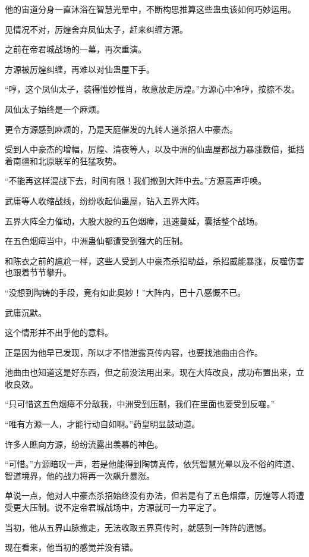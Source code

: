 \begin{this_body}
他的宙道分身一直沐浴在智慧光晕中，不断构思推算这些蛊虫该如何巧妙运用。

见情况不对，厉煌舍弃凤仙太子，赶来纠缠方源。

之前在帝君城战场的一幕，再次重演。

方源被厉煌纠缠，再难以对仙蛊屋下手。

“哼，这个凤仙太子，装得惟妙惟肖，故意放走厉煌。”方源心中冷哼，按捺不发。

凤仙太子始终是一个麻烦。

更令方源感到麻烦的，乃是天庭催发的九转人道杀招人中豪杰。

受到人中豪杰的增幅，厉煌、清夜等人，以及中洲的仙蛊屋都战力暴涨数倍，抵挡着南疆和北原联军的狂猛攻势。

“不能再这样混战下去，时间有限！我们撤到大阵中去。”方源高声呼唤。

武庸等人收缩战线，纷纷收起仙蛊屋，钻入五界大阵。

五界大阵全力催动，大股大股的五色烟瘴，迅速蔓延，囊括整个战场。

在五色烟瘴当中，中洲蛊仙都遭受到强大的压制。

和陈衣之前的尴尬一样，这些人受到人中豪杰杀招助益，杀招威能暴涨，反噬伤害也跟着节节攀升。

“没想到陶铸的手段，竟有如此奥妙！”大阵内，巴十八感慨不已。

武庸沉默。

这个情形并不出乎他的意料。

正是因为他早已发现，所以才不惜泄露真传内容，也要找池曲由合作。

池曲由也知道这是好东西，但之前没法用出来。现在大阵改良，成功布置出来，立收良效。

“只可惜这五色烟瘴不分敌我，中洲受到压制，我们在里面也要受到反噬。”

“唯有方源一人，才能行动自如啊。”药皇明显鼓动道。

许多人瞧向方源，纷纷流露出羡慕的神色。

“可惜。”方源暗叹一声，若是他能得到陶铸真传，依凭智慧光晕以及不俗的阵道、智道境界，他的战力将再一次飙升暴涨。

单说一点，他对人中豪杰杀招始终没有办法，但若是有了五色烟瘴，厉煌等人将遭受更大压制。说不定帝君城战场中，方源就可一力平定了。

当初，他从五界山脉撤走，无法收取五界真传时，就感到一阵阵的遗憾。

现在看来，他当初的感觉并没有错。

\end{this_body}

